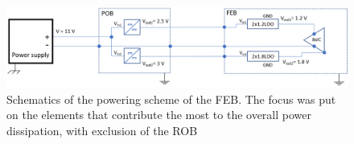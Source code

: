  \begin{figure}[h!]
\centering
\includegraphics[width=1\columnwidth]{Chapter6/DCS/images/powering_diss_feb.png}
\caption{Schematics of the powering scheme of the \gls{FEB}. The focus was put on the elements that contribute the most to the overall power dissipation, with exclusion of the \gls{ROB}}
\label{fig_power_scheme}
\end{figure}
\begin{table}[!h]
\centering
\caption{Power dissipation of the powering scheme in function of the CSA registers values. Once the ASICs are configured, the digital line current remains constant. }
\label{tab:distribution}
\end{table}


